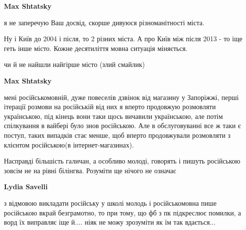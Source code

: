 \begin{itemize}
\begin{itemize}
\textbf{Max Shtatsky} 

я не заперечую Ваш досвід, скорше дивуюся різноманітності міста.

Ну і Київ до 2004 і після, то 2 різних міста. А про Київ між після 2013 - то
іще геть інше місто. Кожне десятиліття мовна ситуація міняється.


 
чи й не найшли найгірше місто (злий смайлик)

 
\textbf{Max Shtatsky} 

мені російськомовній, дуже повеселів дзвінок від магазину у Запоріжжі, перші
ітерації розмови на російській від них я вперто продовжую розмовляти
українською, під кінець вони таки щось вичавили українською, але потім
спілкування в вайбері було знов російською. Але в обслуговуванні все ж таки є
поступ, таких випадків стає менше, щоб вперто продовжували розмовляти з
клієнтом російською(в інтернет-магазинах).
\end{itemize}

 
Насправді більшість галичан, а особливо молоді, говорять і пишуть російською
зовсім не на рівні білінгва. Розуміти ще нічого не означає \Smiley[1.0][yellow]

\begin{itemize}
 
\textbf{Lydia Savelli} 

з відмовою викладати російську у школі молодь і російськомовна пише російською
вкрай безграмотно, то при тому, що фб з пк підкреслює помилки, а ворд їх
виправляє іще й.... ніяк не можу зрозуміти як їм так вдається...


\end{itemize}
\end{itemize}
